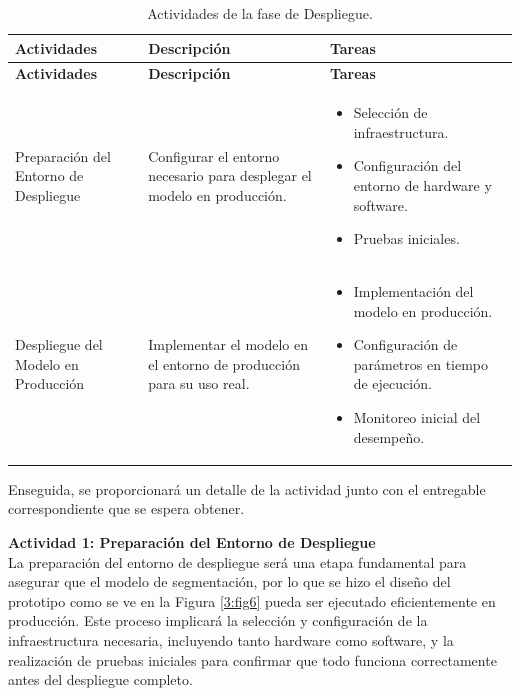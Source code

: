 \vspace{2ex}
 \begingroup
 \renewcommand\arraystretch{1.2}
 \begin{longtable}{>{\raggedright\arraybackslash}p{4cm} >{\raggedright\arraybackslash}p{4cm} >{\raggedright\arraybackslash}p{5cm}}
 \caption{Actividades de la fase de Despliegue.}
 \label{tabla:despliegue}\\
 \toprule
 \textbf{Actividades} & \textbf{Descripción} & \textbf{Tareas} \\
 \midrule
 \endfirsthead
 
 \toprule
 \textbf{Actividades} & \textbf{Descripción} & \textbf{Tareas} \\
 \midrule
 \endhead
 
 \bottomrule
 \endfoot
 
 Preparación del Entorno de Despliegue & Configurar el entorno necesario para desplegar el modelo en producción. & 
    \begin{itemize}
        \item Selección de infraestructura.
        \item Configuración del entorno de hardware y software.
        \item Pruebas iniciales.
    \end{itemize} \\
 
 Despliegue del Modelo en Producción & Implementar el modelo en el entorno de producción para su uso real. & 
 \begin{itemize}
     \item Implementación del modelo en producción.
     \item Configuración de parámetros en tiempo de ejecución.
     \item Monitoreo inicial del desempeño.
 \end{itemize} \\
 \end{longtable}
 \endgroup

 Enseguida, se proporcionará un detalle de la actividad junto con el entregable correspondiente que se espera obtener.

\textbf{Actividad 1: Preparación del Entorno de Despliegue}
\\
La preparación del entorno de despliegue será una etapa fundamental para asegurar que el modelo de segmentación, por lo que se hizo el diseño del prototipo como se ve en la Figura \ref{3:fig6} pueda ser ejecutado eficientemente en producción. Este proceso implicará la selección y configuración de la infraestructura necesaria, incluyendo tanto hardware como software, y la realización de pruebas iniciales para confirmar que todo funciona correctamente antes del despliegue completo.

